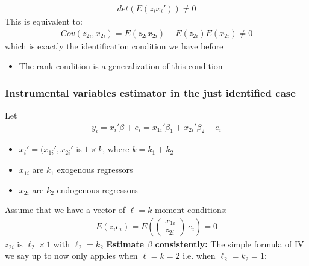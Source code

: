 \documentclass[a4paper,twoside,11pt]{article}
\begin{document}
{\begin{equation*}
\begin{aligned}
det(E(z_i x_i')) \ne 0
\end{aligned} 
\end{equation*}
This is equivalent to:
\begin{equation*}
\begin{aligned}
Cov(z_{2i}, x_{2i}) = E(z_{2i} x_{2i} ) - E(z_{2i}) E(x_{2i}) \ne 0
\end{aligned} 
\end{equation*}
which is exactly the identification condition we have before
\begin{itemize}
    \item The rank condition is a generalization of this condition
\end{itemize}}
\subsubsection{Instrumental variables estimator in the just identified case}
Let 
\begin{equation*}
\begin{aligned}
y_i = x_i' \beta + e_i = x_{1i}' \beta_1 + x_{2i}' \beta_2 + e_i
\end{aligned} 
\end{equation*}
\begin{itemize}
    \item $x_i' = (x_{1i}', x_{2i}'$ is $1 \times k$, where $k=k_1 + k_2$
    \item $x_{1i}$ are $k_1$ exogenous regressors
    \item $x_{2i}$ are $k_2$ endogenous regressors
\end{itemize}
Assume that we have a vector of $\ell = k$ moment conditions: 
\begin{equation*}
\begin{aligned}
E(z_ie_i) = E(\begin{pmatrix}
x_{1i} \\
z_{2i}
\end{pmatrix} \ e_i ) = 0
\end{aligned} 
\end{equation*}
$z_{2i}$ is $\ell_2 \times 1$ with $\ell_2 = k_2$
\newline
\newline
\textbf{Estimate $\beta$ consistently:}
\newline
The simple formula of IV we say up to now only applies when $\ell = k =2$ i.e. when $\ell_2 = k_2 =1:$
\end{document}
